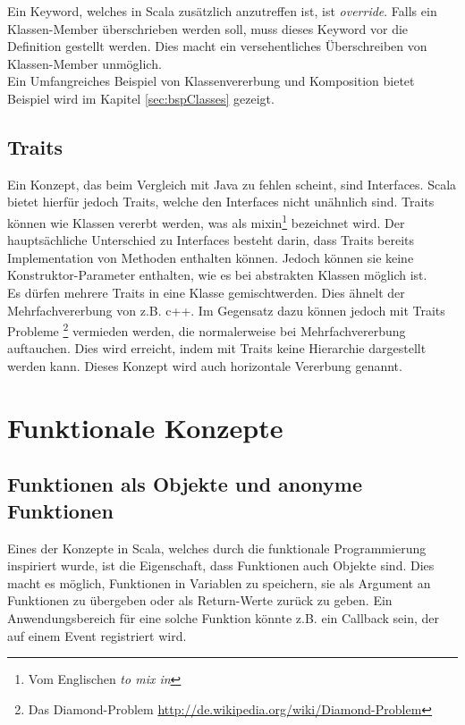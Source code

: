 Ein Keyword, welches in Scala zusätzlich anzutreffen ist, ist 
\emph{override}. Falls ein Klassen-Member überschrieben werden soll,
muss dieses Keyword vor die Definition gestellt werden. Dies macht
ein versehentliches Überschreiben von Klassen-Member unmöglich.\\

Ein Umfangreiches Beispiel von Klassenvererbung und Komposition bietet
Beispiel wird im Kapitel \ref{sec:bspClasses} gezeigt.

\subsection{Traits}

Ein Konzept, das beim Vergleich mit Java zu fehlen scheint, sind 
Interfaces. Scala bietet hierfür jedoch Traits, welche
den Interfaces nicht unähnlich sind. Traits können wie Klassen
vererbt werden, was als \glqq mixin\grqq \footnote{Vom Englischen \emph{to mix in}}
bezeichnet wird. Der hauptsächliche Unterschied zu Interfaces besteht 
darin, dass Traits bereits Implementation von Methoden enthalten
können. Jedoch können sie keine Konstruktor-Parameter enthalten,
wie es bei abstrakten Klassen möglich ist.\\

Es dürfen mehrere Traits in eine Klasse \glqq gemischt\grqq werden. Dies
ähnelt der Mehrfachvererbung von z.B. c++. Im Gegensatz dazu können
jedoch mit Traits Probleme
\footnote{Das Diamond-Problem 
\href{http://de.wikipedia.org/wiki/Diamond-Problem}
{http://de.wikipedia.org/wiki/Diamond-Problem}} vermieden werden, die 
normalerweise bei Mehrfachvererbung auftauchen. Dies wird erreicht,
indem mit Traits keine Hierarchie dargestellt werden kann. Dieses
Konzept wird auch horizontale Vererbung genannt.

\section{Funktionale Konzepte}

\subsection{Funktionen als Objekte und anonyme Funktionen}
\label{sec:functionsObjects}

Eines der Konzepte in Scala, welches durch die funktionale Programmierung
inspiriert wurde, ist die Eigenschaft, dass Funktionen auch Objekte
sind. Dies macht es möglich, Funktionen in Variablen zu speichern, sie
als Argument an Funktionen zu übergeben oder als Return-Werte zurück zu
geben. Ein Anwendungsbereich für eine solche Funktion könnte z.B. ein
Callback sein, der auf einem Event registriert wird.\\

